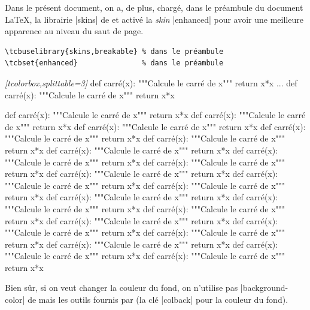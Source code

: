 \documentclass[dvipsnames,svgnames]{article}
\begin{document}
\bigskip
Dans le présent document, on a, de plus, chargé, dans le préambule du document LaTeX,
la librairie |skins| de  et activé la \emph{skin} |enhanced| pour avoir
une meilleure apparence au niveau du saut de page.

\begin{footnotesize}
\begin{Verbatim}
\tcbuselibrary{skins,breakable} % dans le préambule
\tcbset{enhanced}               % dans le préambule
\end{Verbatim}
\end{footnotesize}

\smallskip
\begin{Code}
\begin{Piton}\emph{[tcolorbox,splittable=3]}
def carré(x):
    """Calcule le carré de x"""
    return x*x
...
def carré(x):
    """Calcule le carré de x"""
    return x*x
\end{Piton}
\end{Code}

\begin{Piton}[tcolorbox,splittable=3]
def carré(x):
    """Calcule le carré de x"""
    return x*x
def carré(x):
    """Calcule le carré de x"""
    return x*x
def carré(x):
    """Calcule le carré de x"""
    return x*x
def carré(x):
    """Calcule le carré de x"""
    return x*x
def carré(x):
    """Calcule le carré de x"""
    return x*x
def carré(x):
    """Calcule le carré de x"""
    return x*x
def carré(x):
    """Calcule le carré de x"""
    return x*x
def carré(x):
    """Calcule le carré de x"""
    return x*x
def carré(x):
    """Calcule le carré de x"""
    return x*x
def carré(x):
    """Calcule le carré de x"""
    return x*x
def carré(x):
    """Calcule le carré de x"""
    return x*x
def carré(x):
    """Calcule le carré de x"""
    return x*x
def carré(x):
    """Calcule le carré de x"""
    return x*x
def carré(x):
    """Calcule le carré de x"""
    return x*x
def carré(x):
    """Calcule le carré de x"""
    return x*x
def carré(x):
    """Calcule le carré de x"""
    return x*x
def carré(x):
    """Calcule le carré de x"""
    return x*x
def carré(x):
    """Calcule le carré de x"""
    return x*x
def carré(x):
    """Calcule le carré de x"""
    return x*x
def carré(x):
    """Calcule le carré de x"""
    return x*x
\end{Piton}


Bien sûr, si on veut changer la couleur du fond, on n'utilise pas
|background-color| de  mais les outils fournis par 
(la clé |colback| pour la couleur du fond).
\end{document}
